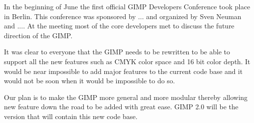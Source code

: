 In the beginning of June the first official GIMP Developers Conference took place in Berlin. This conference was sponsored by ... and organized by Sven Neuman and .... At the meeting most of the core developers met to discuss the future direction of the GIMP.

It was clear to everyone that the GIMP needs to be rewritten to be able to support all the new features such as CMYK color space and 16 bit color depth. It would be near impossible to add major features to the current code base and it would not be soon when it would be impossible to do so. 

Our plan is to make the GIMP more general and more modular thereby allowing new feature down the road to be added with great ease. GIMP 2.0 will be the version that will contain this new code base.



